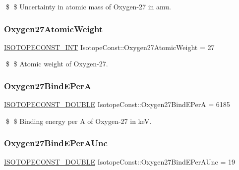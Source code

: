 \$ \$ Uncertainty in atomic mass of Oxygen-\/27 in amu. \mbox{\label{group___isotope_const-_oxygen-_o27_gac96022036f2f74f9f63a65359d50be26}} 
\subsubsection{\texorpdfstring{Oxygen27\+Atomic\+Weight}{Oxygen27AtomicWeight}}
{\footnotesize\ttfamily \mbox{\hyperlink{group___isotope_const-_macros_ga5f18360b3e99483a35c32d789e62621c}{I\+S\+O\+T\+O\+P\+E\+C\+O\+N\+S\+T\+\_\+\+I\+NT}} Isotope\+Const\+::\+Oxygen27\+Atomic\+Weight = 27}

\$ \$ Atomic weight of Oxygen-\/27. \mbox{\label{group___isotope_const-_oxygen-_o27_gab5d7d4cdb4cf06c36d87e9b1fcaafa21}} 
\subsubsection{\texorpdfstring{Oxygen27\+Bind\+E\+PerA}{Oxygen27BindEPerA}}
{\footnotesize\ttfamily \mbox{\hyperlink{group___isotope_const-_macros_ga8f45a7272ce02c0b4c65c44636ed719a}{I\+S\+O\+T\+O\+P\+E\+C\+O\+N\+S\+T\+\_\+\+D\+O\+U\+B\+LE}} Isotope\+Const\+::\+Oxygen27\+Bind\+E\+PerA = 6185}

\$ \$ Binding energy per A of Oxygen-\/27 in keV. \mbox{\label{group___isotope_const-_oxygen-_o27_ga1d159abac5e72cf6e7ea0d1d4c3ae612}} 
\subsubsection{\texorpdfstring{Oxygen27\+Bind\+E\+Per\+A\+Unc}{Oxygen27BindEPerAUnc}}
{\footnotesize\ttfamily \mbox{\hyperlink{group___isotope_const-_macros_ga8f45a7272ce02c0b4c65c44636ed719a}{I\+S\+O\+T\+O\+P\+E\+C\+O\+N\+S\+T\+\_\+\+D\+O\+U\+B\+LE}} Isotope\+Const\+::\+Oxygen27\+Bind\+E\+Per\+A\+Unc = 19}

